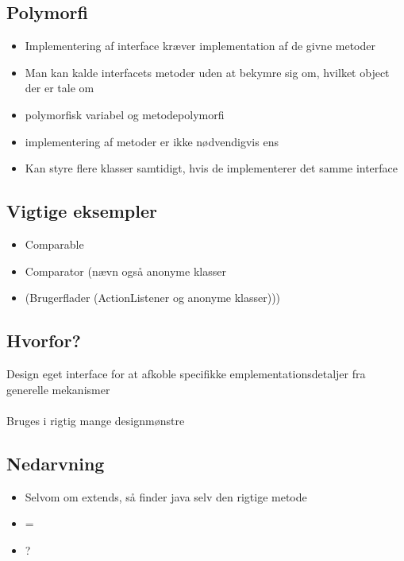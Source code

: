 \subsection{Polymorfi} %
\label{sub:polymorfi}
\begin{itemize}
    \item Implementering af interface kræver implementation af de givne metoder
    \item Man kan kalde interfacets metoder uden at bekymre sig om, hvilket object der er tale om
    \item polymorfisk variabel og metodepolymorfi
    \item implementering af metoder er ikke nødvendigvis ens
    \item Kan styre flere klasser samtidigt, hvis de implementerer det samme interface
\end{itemize}
\subsection{Vigtige eksempler} %
\label{sub:vigtige_eksempler}
\begin{itemize}
    \item Comparable
    \item Comparator (nævn også anonyme klasser
    \item (Brugerflader (ActionListener og anonyme klasser)))
\end{itemize}
\subsection{Hvorfor?} %
\label{sub:hvorfor_}
Design eget interface for at afkoble specifikke emplementationsdetaljer fra generelle mekanismer\\
\\
Bruges i rigtig mange designmønstre
\subsection{Nedarvning} %
\label{sub:nedarvning}
\begin{itemize}
    \item Selvom om extends, så finder java selv den rigtige metode
    \item =
    \item ?
\end{itemize}
\newpage

